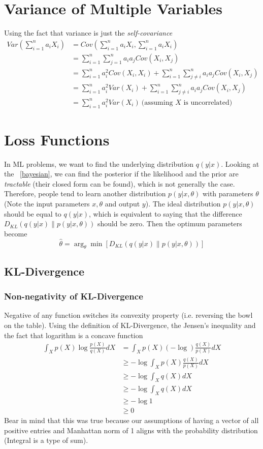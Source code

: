 \documentclass{book}
\numberwithin{equation}{subsection}
\begin{document}
\section{Variance of Multiple Variables}
Using the fact that variance is just the \textit{self-covariance}
\begin{align}
    Var(\sum_{i=1}^{n} a_i X_i) &= Cov(\sum_{i=1}^{n} a_i X_i, \sum_{i=1}^{n} a_i X_i)\\
    &= \sum_{i=1}^{n} \sum_{j=1}^{n} a_i a_j Cov(X_i, X_j)\\
    &= \sum_{i=1}^{n} a_i^2 Cov(X_i, X_i) + \sum_{i=1}^{n} \sum_{j \neq i}^{n} a_i a_j Cov(X_i, X_j)\\
    &= \sum_{i=1}^{n} a_i^2 Var(X_i) + \sum_{i=1}^{n} \sum_{j \neq i}^{n} a_i a_j Cov(X_i, X_j)\\
    &= \sum_{i=1}^{n} a_i^2 Var(X_i)\ \text{(assuming $X$ is uncorrelated)}\label{var_derivation_res}
\end{align}
\section{Loss Functions}
\label{lossfun}
In ML problems, we want to find the underlying distribution $q(y|x)$. Looking at the ~\ref{bayesian}, we can find the posterior if the likelihood and the prior are \textit{tractable} (their closed form can be found), which is not generally the case. Therefore, people tend to learn another distribution $p(y|x,\theta)$ with parameters $\theta$ (Note the input parameters $x, \theta$ and output $y$). The ideal distribution $p(y|x,\theta)$ should be equal to $q(y|x)$, which is equivalent to saying that the difference $D_{KL}(q(y|x)\parallel p(y|x,\theta))$ should be zero. Then the optimum parameters become
\begin{equation}
    \hat{\theta}
    = \arg_\theta \min[D_{KL}(q(y|x) \parallel p(y|x,\theta))]
\end{equation}
\subsection{KL-Divergence}
\subsubsection{Non-negativity of KL-Divergence}
\label{kl_nonneg}
Negative of any function switches its convexity property (i.e. reversing the bowl on the table). Using the definition of KL-Divergence, the Jensen's inequality and the fact that logarithm is a concave function
\begin{align}
     \int_X p(X)\log\frac{p(X)}{q(X)} dX &= \int_X p(X)(-\log)\frac{q(X)}{p(X)} dX\\
     &\geq -\log \int_X p(X)\frac{q(X)}{p(X)} dX\\
     &\geq -\log \int_X q(X) dX\\
     &\geq -\log \int_X q(X) dX\\
     &\geq -\log 1 \\
     &\geq 0
\end{align}
Bear in mind that this was true because our assumptions of having a vector of all positive entries and Manhattan norm of 1 aligns with the probability distribution (Integral is a type of sum).
\end{document}
